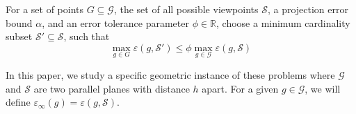 \begin{problem}
For a set of points $G \subseteq \mathcal{G}$, 
the set of all possible viewpoints $\mathcal{S}$, a projection error bound $\alpha$, 
and an error tolerance parameter $\phi \in \mathbb{R}$,
choose a minimum cardinality subset $\mathcal{S'} \subseteq \mathcal{S}$, such that
$$\max_{g \in {G}} \varepsilon(g,\mathcal{S'}) \leq \phi \max_{g \in \mathcal{G}} \varepsilon(g,\mathcal{S})$$
\label{prob:multip}
\end{problem}

In this paper, we study a specific geometric instance of these problems where  $\mathcal{G}$ and $\mathcal{S}$ are two parallel planes with distance $h$ apart. 
For a given $g \in \mathcal{G}$, we will define $\varepsilon_{\infty}(g) = \varepsilon(g,\mathcal{S})$.
%
%
